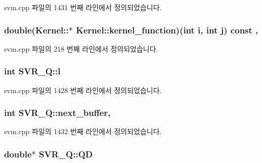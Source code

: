 svm.\+cpp 파일의 1431 번째 라인에서 정의되었습니다.

\hypertarget{class_kernel_a575eeb588e8a5c62ff3228a35e255a02}{
\subsubsection[{kernel\+\_\+function}]{\setlength{\rightskip}{0pt plus 5cm}double(Kernel\+::$\ast$ Kernel\+::kernel\+\_\+function)(int i, int j) const \hspace{0.3cm}{\ttfamily [protected]}, {\ttfamily [inherited]}}}\label{class_kernel_a575eeb588e8a5c62ff3228a35e255a02}


svm.\+cpp 파일의 218 번째 라인에서 정의되었습니다.

\hypertarget{class_s_v_r___q_aa3420dab3d0b1eabdc0614c71321ab3c}{
\subsubsection[{l}]{\setlength{\rightskip}{0pt plus 5cm}int S\+V\+R\+\_\+\+Q\+::l\hspace{0.3cm}{\ttfamily [private]}}}\label{class_s_v_r___q_aa3420dab3d0b1eabdc0614c71321ab3c}


svm.\+cpp 파일의 1428 번째 라인에서 정의되었습니다.

\hypertarget{class_s_v_r___q_acbdbde823b714d30097648c9dc109524}{
\subsubsection[{next\+\_\+buffer}]{\setlength{\rightskip}{0pt plus 5cm}int S\+V\+R\+\_\+\+Q\+::next\+\_\+buffer\hspace{0.3cm}{\ttfamily [mutable]}, {\ttfamily [private]}}}\label{class_s_v_r___q_acbdbde823b714d30097648c9dc109524}


svm.\+cpp 파일의 1432 번째 라인에서 정의되었습니다.

\hypertarget{class_s_v_r___q_aaa4a8b37dbc15610de7fe46df8874e25}{
\subsubsection[{Q\+D}]{\setlength{\rightskip}{0pt plus 5cm}double$\ast$ S\+V\+R\+\_\+\+Q\+::\+Q\+D\hspace{0.3cm}{\ttfamily [private]}}}\label{class_s_v_r___q_aaa4a8b37dbc15610de7fe46df8874e25}


